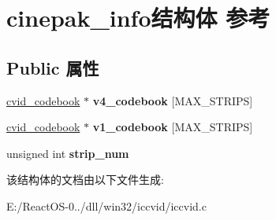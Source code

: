 \hypertarget{structcinepak__info}{}\section{cinepak\+\_\+info结构体 参考}
\label{structcinepak__info}
\subsection*{Public 属性}
\begin{DoxyCompactItemize}
\item 
\mbox{\label{structcinepak__info_a31a3f40cf33eb97b86bc0d950ca51a04}} 
\hyperlink{structcvid__codebook}{cvid\+\_\+codebook} $\ast$ {\bfseries v4\+\_\+codebook} \mbox{[}M\+A\+X\+\_\+\+S\+T\+R\+I\+PS\mbox{]}
\item 
\mbox{\label{structcinepak__info_a522f5de69ec2c2230ee0292cfa567d32}} 
\hyperlink{structcvid__codebook}{cvid\+\_\+codebook} $\ast$ {\bfseries v1\+\_\+codebook} \mbox{[}M\+A\+X\+\_\+\+S\+T\+R\+I\+PS\mbox{]}
\item 
\mbox{\label{structcinepak__info_a3ba6a880ae848499039966730f8a3503}} 
unsigned int {\bfseries strip\+\_\+num}
\end{DoxyCompactItemize}


该结构体的文档由以下文件生成\+:\begin{DoxyCompactItemize}
\item 
E\+:/\+React\+O\+S-\/0../dll/win32/iccvid/iccvid.\+c\end{DoxyCompactItemize}
